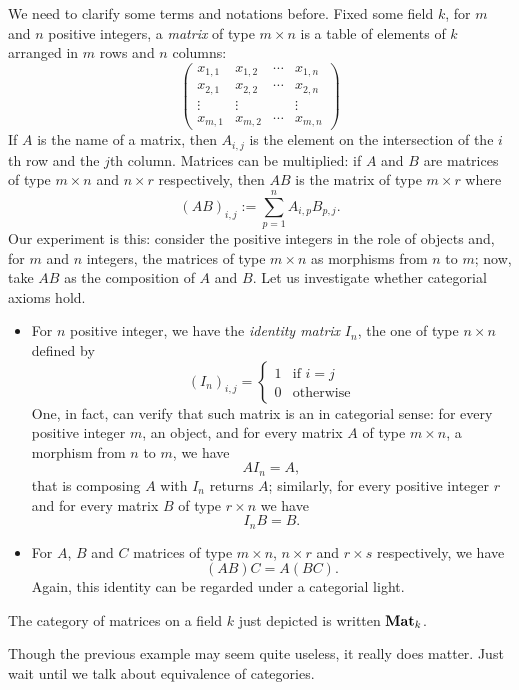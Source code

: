 \begin{example}[Matrices]
We need to clarify some terms and notations before. Fixed some field \(k\), for \(m\) and \(n\) positive integers, a {\em matrix} of type \(m \times n\) is a table of elements of \(k\) arranged in \(m\) rows and \(n\) columns:
\[\begin{pmatrix}
x_{1,1} & x_{1,2} & \cdots{} & x_{1,n} \\
x_{2,1} & x_{2,2} & \cdots{} & x_{2,n} \\
\vdots  & \vdots  &          & \vdots  \\
x_{m,1} & x_{m,2} & \cdots{} & x_{m,n}
\end{pmatrix}\]
If \(A\) is the name of a matrix, then \(A_{i, j}\) is the element on the intersection of the \(i\)th row and the \(j\)th column. Matrices can be multiplied: if \(A\) and \(B\) are matrices of type \(m \times n\) and \(n \times r\) respectively, then \(AB\) is the matrix of type \(m \times r\) where
\[(AB)_{i, j} := \sum_{p = 1}^n A_{i, p} B_{p ,j} .\]
Our experiment is this: consider the positive integers in the role of objects and, for \(m\) and \(n\) integers, the matrices of type \(m \times n\) as morphisms from \(n\) to \(m\); now, take \(AB\) as the composition of \(A\) and \(B\). Let us investigate whether categorial axioms hold.
\begin{itemize}
\item For \(n\) positive integer, we have the {\em identity matrix} \(I_n\), the one of type \(n \times n\) defined by
\[(I_n)_{i, j} = \begin{cases}
1 & \text{if } i = j \\
0 & \text{otherwise}
\end{cases}\]
One, in fact, can verify that such matrix is an  in categorial sense: for every positive integer \(m\), an object, and for every matrix \(A\) of type \(m \times n\), a morphism from \(n\) to \(m\), we have
\[A I_n = A ,\]
that is composing \(A\) with \(I_n\) returns \(A\); similarly, for every positive integer \(r\) and for every matrix \(B\) of type \(r \times n\) we have
\[I_n B = B .\]
\item For \(A\), \(B\) and \(C\) matrices of type \(m \times n\), \(n \times r\) and \(r \times s\) respectively, we have
\[(AB)C = A(BC) .\]
Again, this identity can be regarded under a categorial light.
\end{itemize}
The category of matrices on a field \(k\) just depicted is written \(\mathbf{Mat}_k\).
\end{example}

\begin{remark}
Though the previous example may seem quite useless, it really does matter. Just wait until we talk about equivalence of categories.  
\end{remark}

\begin{example}
\NotaInterna{\dots{}}
\end{example}
